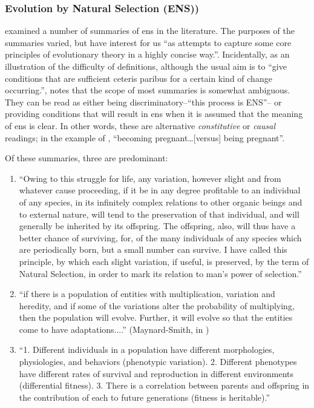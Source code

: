 \subsubsection{Evolution by Natural Selection (ENS))}\label{ens-evolution-by-natural-selection}

\cite{Godfrey-Smith2007} examined a number of summaries of \gls{ens} in the literature. The purposes of the summaries varied, but have interest for us ``as attempts to capture some core principles of evolutionary theory in a highly concise way.''. Incidentally, as an illustration of the difficulty of definitions, although the usual aim is to ``give conditions that are sufficient ceteris paribus for a certain kind of change occurring.'', \cite{Godfrey-Smith2007} notes that the scope of most summaries is somewhat ambiguous. They can be read as either being discriminatory--``this process is ENS''-- or providing conditions that will result in \gls{ens} when it is assumed that the meaning of \gls{ens} is clear. In other words, these are alternative \emph{constitutive} or \emph{causal} readings; in the example of \cite{Godfrey-Smith2007}, ``becoming pregnant\ldots{}{[}versus{]} being pregnant''.

Of these summaries, three are predominant:

\begin{enumerate}
\item
``Owing to this struggle for life, any variation, however slight and from whatever cause proceeding, if it be in any degree profitable to an individual of any species, in its infinitely complex relations to other organic beings and to external nature, will tend to the preservation of that individual, and will generally be inherited by its offspring. The offspring, also, will thus have a better chance of surviving, for, of the many individuals of any species which are periodically born, but a small number can survive. I have called this principle, by which each slight variation, if useful, is preserved, by the term of Natural Selection, in order to mark its relation to man's power of selection.'' \cite{Darwin1859}

\item
``if there is a population of entities with multiplication, variation and heredity, and if some of the variations alter the probability of multiplying, then the population will evolve. Further, it will evolve so that the entities come to have adaptations....'' (Maynard-Smith, in \cite{Griesemer2001})

\item
``1. Different individuals in a population have different morphologies, physiologies, and behaviors (phenotypic variation). 2. Different phenotypes have different rates of survival and reproduction in different environments (differential fitness). 3. There is a correlation between parents and offspring in the contribution of each to future generations (fitness is heritable).'' \cite{Lewontin:1970mc}

\end{enumerate}

